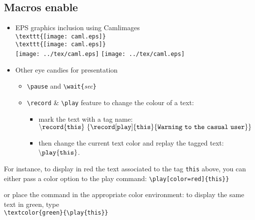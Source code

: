 \documentclass[12pt]{article}
\begin{document}
\subsection* {Macros enable}
  \begin{itemize}
  \item EPS graphics inclusion using Camlimages\\
        \verb+\texttt{[image: caml.eps]}+\\
        \verb+\texttt{[image: caml.eps]}+\\
        \texttt{[image: ../tex/caml.eps]}
        \texttt{[image: ../tex/caml.eps]}
  \item Other eye candies for presentation
        \begin{itemize}
        \item \verb+\pause+ \pause
          and \verb+\wait{+{\em sec}\verb+}+ 

        \item \verb+\record+ \& \verb+\play+ feature to change the colour
         of a text:
         \begin{itemize}
           \item mark the text with a tag name:\\
             $\tt{\backslash}record\{this\}\
                  \{\record[play]{this}{Warning~to~the~casual~user}\}$
           \item then change the current text color and replay the tagged text:
          $\tt{\backslash}play\{this\}$.
         \end{itemize}
        \end{itemize}
\end{itemize}

\noindent
For instance, to display in red the text associated to the tag
{\tt this} above, you can either pass a color option to the play command:
\verb+\play[color=red]{this}}+\\
\pause%
\textcolor{c1}{}\pause

\noindent
or place the command in the appropriate color environment:
to display the same text in green, type\\
\verb+\textcolor{green}{\play{this}}+\\
\pause\textcolor{green}{\pause}
\end{document}
